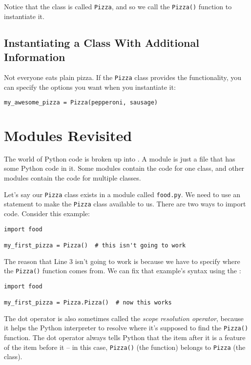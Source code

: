 Notice that the class is called \texttt{Pizza}, and so we call the \texttt{Pizza()} function to instantiate it.

\subsection{Instantiating a Class With Additional Information}

Not everyone eats plain pizza.  If the \texttt{Pizza} class provides the functionality, you can specify the options you want when you instantiate it:

\begin{verbatim}
my_awesome_pizza = Pizza(pepperoni, sausage)
\end{verbatim}

\section{Modules Revisited}

The world of Python code is broken up into .  A module is just a file that has some Python code in it.  Some modules contain the code for one class, and other modules contain the code for multiple classes.

Let's say our \texttt{Pizza} class exists in a module called \texttt{food.py}.  We need to use an  statement to make the \texttt{Pizza} class available to us.  There are two ways to import code.  Consider this example:

\begin{verbatim}
import food

my_first_pizza = Pizza()  # this isn't going to work
\end{verbatim}

The reason that Line 3 isn't going to work is because we have to specify where the \texttt{Pizza()} function comes from.  We can fix that example's syntax using the :

\begin{verbatim}
import food

my_first_pizza = Pizza.Pizza()  # now this works
\end{verbatim}

The dot operator is also sometimes called the \textit{scope resolution operator}, because it helps the Python interpreter to resolve where it's supposed to find the \texttt{Pizza()} function.  The dot operator always tells Python that the item after it is a feature of the item before it -- in this case, \texttt{Pizza()} (the function) belongs to \texttt{Pizza} (the class).

